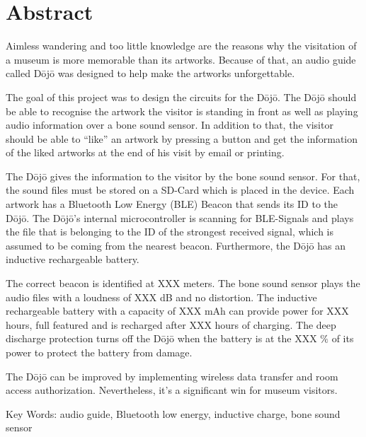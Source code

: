 \section*{Abstract}\label{sec:abstract}

Aimless wandering and too little knowledge are the reasons why the visitation of a museum is more memorable than its artworks. Because of that, an audio guide called Dōjō was designed to help make the artworks unforgettable.

The goal of this project was to design the circuits for the Dōjō. The Dōjō should be able to recognise the artwork the visitor is standing in front as well as playing audio information over a bone sound sensor. In addition to that, the visitor should be able to “like” an artwork by pressing a button and get the information of the liked artworks at the end of his visit by email or printing.

The Dōjō gives the information to the visitor by the bone sound sensor. For that, the sound files must be stored on a SD-Card which is placed in the device. Each artwork has a Bluetooth Low Energy (BLE) Beacon that sends its ID to the Dōjō. The Dōjō’s internal microcontroller is scanning for BLE-Signals and plays the file that is belonging to the ID of the strongest received signal, which is assumed to be coming from the nearest beacon. Furthermore, the Dōjō has an inductive rechargeable battery.

The correct beacon is identified at XXX meters. The bone sound sensor plays the audio files with a loudness of XXX dB and no distortion. The inductive rechargeable battery with a capacity of XXX mAh can provide power for XXX hours, full featured and is recharged after XXX hours of charging. The deep discharge protection turns off the Dōjō when the battery is at the XXX $\%$ of its power to protect the battery from damage.

The Dōjō can be improved by implementing wireless data transfer and room access authorization. Nevertheless, it's a significant win for museum visitors.

Key Words: audio guide, Bluetooth low energy, inductive charge, bone sound sensor
